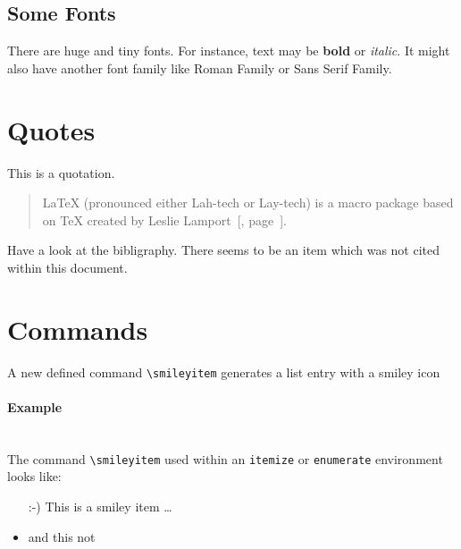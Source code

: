 \documentclass[a4paper, 10pt]{article}
\newcommand{\smileyitem}{:-)}
\begin{document}
		\subsection{Some Fonts}
		\hspace{3pt} {}There are {\huge huge} and {\tiny tiny} fonts. For instance, text may be \textbf{bold} or \textit{italic}. It might also have another font family like Roman Family or {\sffamily Sans Serif Family}.
	
	\section{Quotes}
	This is a quotation.
	\begin{quotation}
	LaTeX (pronounced either Lah-tech or Lay-tech) is a macro package based on TeX created by Leslie Lamport~[\cite{wikibook_1}, page~\pageref{ref}].
	\end{quotation}
	
	{}Have a look at the bibligraphy. There seems to be an item which was not cited within this document.
	
	\section{Commands}
	A new defined command \texttt{\textbackslash smileyitem} generates a list entry with a smiley icon
	
	\paragraph*{Example} \hspace{0pt} \\
	The command \texttt{\textbackslash smileyitem} used within an \texttt{itemize} or \texttt{enumerate} environment looks like:
	\begin{enumerate}
		\item[\smileyitem] This is a smiley item \dots
	\end{enumerate}
	
	\begin{itemize}
		\item  and this not 
	\end{itemize}
	
	
	\medskip
	
	 {\label{ref}}
	
	
	\newpage
	\printindex
\end{document}
